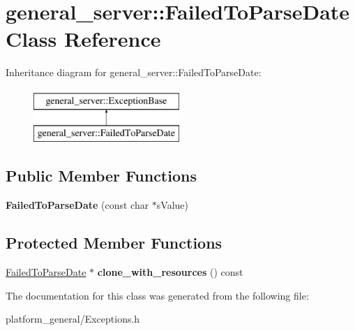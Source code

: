 \hypertarget{classgeneral__server_1_1FailedToParseDate}{\section{general\-\_\-server\-:\-:\-Failed\-To\-Parse\-Date \-Class \-Reference}
\label{classgeneral__server_1_1FailedToParseDate}
}
\-Inheritance diagram for general\-\_\-server\-:\-:\-Failed\-To\-Parse\-Date\-:\begin{figure}[H]
\begin{center}
\leavevmode
\includegraphics[height=2.000000cm]{classgeneral__server_1_1FailedToParseDate}
\end{center}
\end{figure}
\subsection*{\-Public \-Member \-Functions}
\begin{DoxyCompactItemize}
\item 
\hypertarget{classgeneral__server_1_1FailedToParseDate_a5fb9e64935d9911d26c92fb0a86b43d5}{{\bfseries \-Failed\-To\-Parse\-Date} (const char $\ast$s\-Value)}\label{classgeneral__server_1_1FailedToParseDate_a5fb9e64935d9911d26c92fb0a86b43d5}

\end{DoxyCompactItemize}
\subsection*{\-Protected \-Member \-Functions}
\begin{DoxyCompactItemize}
\item 
\hypertarget{classgeneral__server_1_1FailedToParseDate_a9aa05ad241fe436d75c51359218891ce}{\hyperlink{classgeneral__server_1_1FailedToParseDate}{\-Failed\-To\-Parse\-Date} $\ast$ {\bfseries clone\-\_\-with\-\_\-resources} () const }\label{classgeneral__server_1_1FailedToParseDate_a9aa05ad241fe436d75c51359218891ce}

\end{DoxyCompactItemize}


\-The documentation for this class was generated from the following file\-:\begin{DoxyCompactItemize}
\item 
platform\-\_\-general/\-Exceptions.\-h\end{DoxyCompactItemize}

